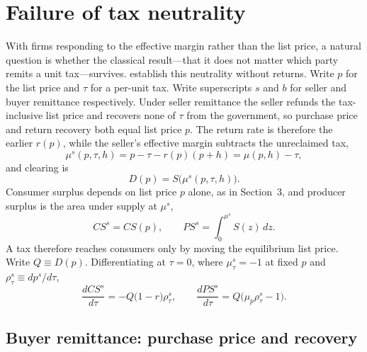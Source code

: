 \documentclass[11pt]{article}
\begin{document}
\section{Failure of tax neutrality}
\label{sec:tax-neutrality}

With firms responding to the effective margin rather than the list price, a
natural question is whether the classical result---that it does not matter
which party remits a unit tax---survives.  \citet{weyl2013pass}
establish this neutrality without returns.  Write $p$ for the list
price and $\tau$ for a per-unit tax.
Write superscripts $s$ and $b$ for seller and buyer remittance respectively.
Under seller remittance the seller refunds the tax-inclusive list price
and recovers none of $\tau$ from the government, so purchase price and return
recovery both equal list price $p$.  The return rate is therefore the earlier
$r(p)$, while the seller's effective margin subtracts the unreclaimed tax,
\[
  \mu^{s}(p,\tau,h)=p-\tau-r(p)(p+h)=\mu(p,h)-\tau,
\]
and clearing is
\begin{equation}
  D(p) = S\bigl(\mu^{s}(p,\tau,h)\bigr).
  \label{eq:clear-seller}
\end{equation}
Consumer surplus depends on list price $p$ alone, as in Section~3, and producer
surplus is the area under supply at $\mu^{s}$,
\[
  CS^{s}=CS(p),
  \qquad
  PS^{s}=\int_0^{\mu^{s}}S(z)\,dz.
\]
A tax therefore reaches consumers only by moving the equilibrium list
price.  Write $Q\equiv D(p)$.  Differentiating at $\tau=0$, where
$\mu^{s}_{\tau}=-1$ at fixed $p$ and $\rho^{s}_{\tau}\equiv dp^{s}/d\tau$,
\begin{equation}
  \frac{dCS^{s}}{d\tau}
  =-Q\bigl(1-r\bigr)\rho^{s}_{\tau},
  \qquad
  \frac{dPS^{s}}{d\tau}
  =Q\bigl(\mu_p\rho^{s}_{\tau}-1\bigr).
  \label{eq:dCS-dPS-seller}
\end{equation}

\subsection{Buyer remittance: purchase price and recovery}
\end{document}

